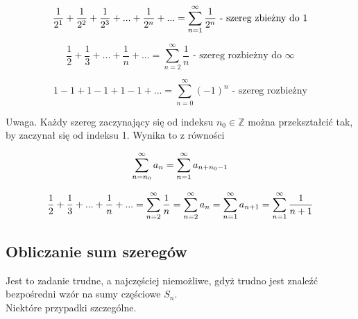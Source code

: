 \begin{przyklad}
$$ \frac{1}{2^1} + \frac{1}{2^2} + \frac{1}{2^3} + ... + \frac{1}{2^n} + ... = \sum\limits_{n = 1}^{\infty} \frac{1}{2^n} 
\textrm { - szereg zbieżny do 1}$$

$$ \frac{1}{2} + \frac{1}{3} + ... + \frac{1}{n} + ... = \sum\limits_{n = 2}^{\infty} \frac{1}{n} 
\textrm { - szereg rozbieżny do } \infty$$

$$ 1 - 1 + 1 - 1 + 1 - 1 + ... = \sum\limits_{n = 0}^{\infty} (-1)^n \textrm{ - szereg rozbieżny} $$
\end{przyklad}

Uwaga. Każdy szereg zaczynający się od indeksu $ n_0 \in \mathbb{Z} $ można przekształcić tak, by zaczynał się od indeksu 1.
Wynika to z równości

$$ \sum\limits_{n = n_0}^{\infty} a_n = \sum\limits_{n = 1}^{\infty} a_{n + n_0 - 1} $$

$$ \frac{1}{2} + \frac{1}{3} + ... + \frac{1}{n} + ... = \sum\limits_{n = 2}^{\infty} \frac{1}{n} = \sum\limits_{n = 2}^{\infty} a_n
= \sum\limits_{n = 1}^{\infty} a_{n + 1} = \sum\limits_{n = 1}^{\infty} \frac{1}{n + 1} $$

\subsection*{Obliczanie sum szeregów}

Jest to zadanie trudne, a najczęściej niemożliwe, gdyż trudno jest znaleźć bezpośredni wzór na sumy częściowe $S_n$. \\

Niektóre przypadki szczególne.

